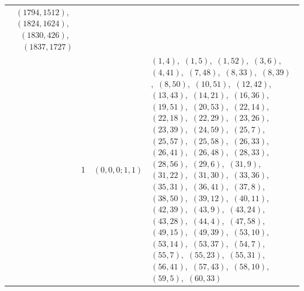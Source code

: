 \documentclass[11pt]{article}
\begin{document}
\begin{longtable}{@{}rrl>{\raggedright\arraybackslash}p{}@{}}
$(1794,1512)$,\allowbreak\ $(1824,1624)$,\allowbreak\ $(1830,426)$,\allowbreak\ $(1837,1727)$\\
\addlinespace[3pt]
61 & 1 & $(0,0,0;1,1)$ & $(1,4)$,\allowbreak\ $(1,5)$,\allowbreak\ $(1,52)$,\allowbreak\ $(3,6)$,\allowbreak\ $(4,41)$,\allowbreak\ $(7,48)$,\allowbreak\ $(8,33)$,\allowbreak\ $(8,39)$,\allowbreak\ $(8,50)$,\allowbreak\ $(10,51)$,\allowbreak\ $(12,42)$,\allowbreak\ $(13,43)$,\allowbreak\ $(14,21)$,\allowbreak\ $(16,36)$,\allowbreak\ $(19,51)$,\allowbreak\ $(20,53)$,\allowbreak\ $(22,14)$,\allowbreak\ $(22,18)$,\allowbreak\ $(22,29)$,\allowbreak\ $(23,26)$,\allowbreak\ $(23,39)$,\allowbreak\ $(24,59)$,\allowbreak\ $(25,7)$,\allowbreak\ $(25,57)$,\allowbreak\ $(25,58)$,\allowbreak\ $(26,33)$,\allowbreak\ $(26,41)$,\allowbreak\ $(26,48)$,\allowbreak\ $(28,33)$,\allowbreak\ $(28,56)$,\allowbreak\ $(29,6)$,\allowbreak\ $(31,9)$,\allowbreak\ $(31,22)$,\allowbreak\ $(31,30)$,\allowbreak\ $(33,36)$,\allowbreak\ $(35,31)$,\allowbreak\ $(36,41)$,\allowbreak\ $(37,8)$,\allowbreak\ $(38,50)$,\allowbreak\ $(39,12)$,\allowbreak\ $(40,11)$,\allowbreak\ $(42,39)$,\allowbreak\ $(43,9)$,\allowbreak\ $(43,24)$,\allowbreak\ $(43,28)$,\allowbreak\ $(44,4)$,\allowbreak\ $(47,58)$,\allowbreak\ $(49,15)$,\allowbreak\ $(49,39)$,\allowbreak\ $(53,10)$,\allowbreak\ $(53,14)$,\allowbreak\ $(53,37)$,\allowbreak\ $(54,7)$,\allowbreak\ $(55,7)$,\allowbreak\ $(55,23)$,\allowbreak\ $(55,31)$,\allowbreak\ $(56,41)$,\allowbreak\ $(57,43)$,\allowbreak\ $(58,10)$,\allowbreak\ $(59,5)$,\allowbreak\ $(60,33)$\\

\end{longtable}
\end{document}
